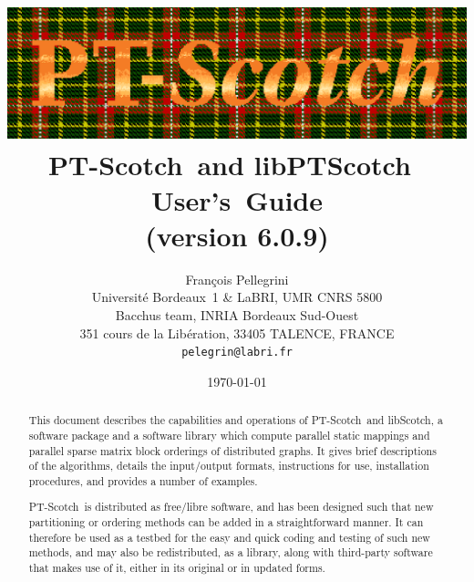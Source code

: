 \documentclass{article}
\newcommand{\libscotch}{{\sc libScotch}}         %
\newcommand{\ptscotch}{{\sc PT-Scotch}}          %
\newcommand{\libptscotch}{{\sc libPTScotch}}     %
\newcommand{\scotchver}{6.0}
\newcommand{\scotchversub}{6.0.9}
\begin{document}
\date{\today}

\title{\includegraphics[scale=0.8]{p_f_logo.ps}\\[1em]
       {\LARGE\bf \ptscotch\ and \libptscotch\ {\sc \scotchver} \mbox{User's Guide}}\\[1em]%
       {\normalsize (version \scotchversub)}
}

\author{Fran\c cois Pellegrini\\
Universit\'e Bordeaux~1 \& LaBRI, UMR CNRS 5800\\
Bacchus team, INRIA Bordeaux Sud-Ouest\\
351 cours de la Lib\'eration, 33405 TALENCE, FRANCE\\
{\tt pelegrin@labri.fr}}

\maketitle

\begin{abstract}

This document describes the capabilities and operations of
\ptscotch\ and \libscotch, a software package and a software library
which compute parallel static mappings and parallel sparse matrix
block orderings of distributed graphs. It gives brief descriptions of
the algorithms, details the input/output formats, instructions for
use, installation procedures, and provides a number of examples.

\ptscotch\ is distributed as free/libre software, and has been
designed such that new partitioning or ordering methods can be added
in a straightforward manner. It can therefore be used as a testbed for
the easy and quick coding and testing of such new methods, and may
also be redistributed, as a library, along with third-party software
that makes use of it, either in its original or in updated forms.
\end{abstract}

\clearpage


\tableofcontents
\end{document}

